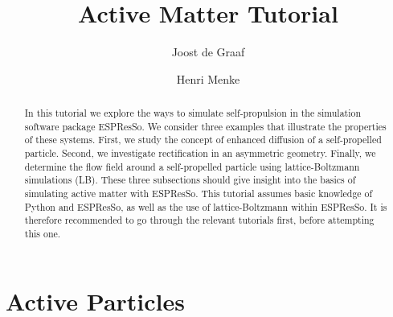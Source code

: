 \documentclass[aip,jcp,reprint,a4paper,onecolumn,amsmath]{revtex4-1}
\newcommand{\es}{\mbox{\textsf{ESPResSo}}\xspace}
\begin{document}
\title{Active Matter Tutorial}
\author{Joost de Graaf}
\author{Henri Menke}

\begin{abstract}
In this tutorial we explore the ways to simulate self-propulsion in the simulation software package \es{}. We consider three examples that illustrate the properties of these systems. First, we study the concept of enhanced diffusion of a self-propelled particle. Second, we investigate rectification in an asymmetric geometry. Finally, we determine the flow field around a self-propelled particle using lattice-Boltzmann simulations (LB). These three subsections should give insight into the basics of simulating active matter with \es{}. This tutorial assumes basic knowledge of Python and \es{}, as well as the use of lattice-Boltzmann within \es{}. It is therefore recommended to go through the relevant tutorials first, before attempting this one.
\end{abstract}

\maketitle

\section{\label{sec:active}Active Particles}
\end{document}
